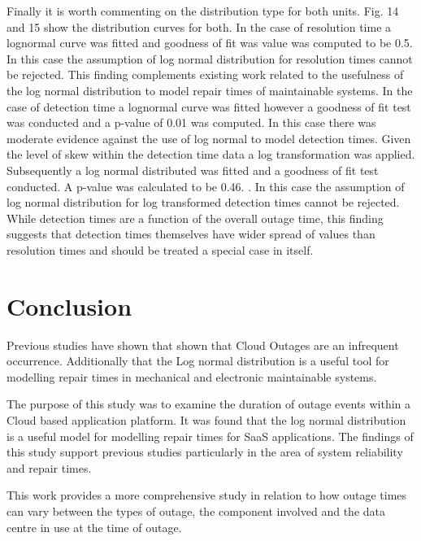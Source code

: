 \documentclass[conference]{IEEEtran}
\begin{document}
Finally it is worth commenting on the distribution type for both units. Fig. 14 and 15 show the distribution curves for both.  In the case of resolution time a lognormal curve was fitted and goodness of fit was value was computed to be 0.5. In this case the assumption of log normal distribution for resolution times cannot be rejected. This finding complements existing work related to the usefulness of the log normal distribution to model repair times of maintainable systems. In the case of detection time a lognormal curve was fitted however a goodness of fit test was conducted and a p-value of 0.01 was computed. In this case there was moderate evidence against the use of log normal to model detection times. Given the level of skew within the detection time data a log transformation was applied. Subsequently a log normal distributed was fitted and a goodness of fit test conducted. A p-value was calculated to be 0.46. . In this case the assumption of log normal distribution for log transformed detection times cannot be rejected. While detection times are a function of the overall outage time, this finding suggests that detection times themselves have wider spread of values than resolution times and should be treated a special case in itself. \par



\vspace{-1mm}
\section{Conclusion}
Previous studies have shown that shown that Cloud Outages are an infrequent occurrence. Additionally that the Log normal distribution is a useful tool for modelling repair times in mechanical and electronic maintainable systems. \par

The purpose of this study was to examine the duration of outage events within a Cloud based application platform. It was found that the log normal distribution is a useful model for modelling repair times for SaaS applications. The findings of this study support previous studies particularly in the area of system reliability and repair times. \par

This work provides a more comprehensive study in relation to how outage times can vary between the types of outage, the component involved and the data centre in use at the time of outage. \par
\end{document}
